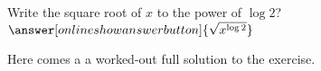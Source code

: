 \documentclass{ximera}
\begin{document}
\begin{exercise}
\begin{question}
        Write the square root of $x$ to the power of $\log 2$?  $\answer[onlineshowanswerbutton]{\sqrt{x^{\log 2}}}$
		\begin{solution}[show]
			Here comes a a worked-out full solution to the exercise.
		\end{solution}
	\end{question}
\end{exercise}
\end{document}
